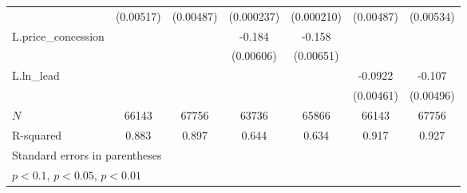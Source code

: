 {\begin{tabular}{l*{6}{c}}
            &   (0.00517)         &   (0.00487)         &  (0.000237)         &  (0.000210)         &   (0.00487)         &   (0.00534)         \\
\addlinespace
L.price\_concession&                     &                     &      -0.184\sym{***}&      -0.158\sym{***}&                     &                     \\
            &                     &                     &   (0.00606)         &   (0.00651)         &                     &                     \\
\addlinespace
L.ln\_lead   &                     &                     &                     &                     &     -0.0922\sym{***}&      -0.107\sym{***}\\
            &                     &                     &                     &                     &   (0.00461)         &   (0.00496)         \\
\midrule
\(N\)       &       66143         &       67756         &       63736         &       65866         &       66143         &       67756         \\
R-squared   &       0.883         &       0.897         &       0.644         &       0.634         &       0.917         &       0.927         \\
\bottomrule
\multicolumn{7}{l}{\footnotesize Standard errors in parentheses}\\
\multicolumn{7}{l}{\footnotesize \sym{*} \(p<0.1\), \sym{**} \(p<0.05\), \sym{***} \(p<0.01\)}\\
\end{tabular}
}
